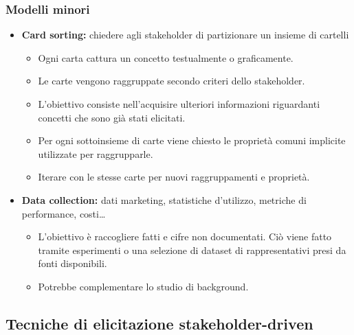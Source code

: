 \documentclass[../main.tex]{subfiles}
\begin{document}
\subsubsection{Modelli minori}
\begin{itemize}
	\item \textbf{Card sorting:} chiedere agli stakeholder di partizionare un insieme  di cartelli
	\begin{itemize}
		\item Ogni carta cattura un concetto testualmente o graficamente.
		\item Le carte vengono raggruppate secondo criteri dello stakeholder.
		\item L'obiettivo consiste nell'acquisire ulteriori informazioni riguardanti concetti che sono già stati elicitati.
		\item Per ogni sottoinsieme di carte viene chiesto le proprietà comuni implicite utilizzate per raggrupparle.
		\item Iterare con le stesse carte per nuovi raggruppamenti e proprietà. 
	\end{itemize}
\end{itemize}
\begin{itemize}
	\item \textbf{Data collection:} dati marketing, statistiche d'utilizzo, metriche di performance, costi\dots
	\begin{itemize}
		\item L'obiettivo è raccogliere fatti e cifre non documentati. Ciò viene fatto tramite esperimenti o una selezione di dataset di rappresentativi presi da fonti disponibili.
		\item Potrebbe complementare lo studio di background. 
	\end{itemize}
\end{itemize}
\subsection{Tecniche di elicitazione stakeholder-driven}
\end{document}
